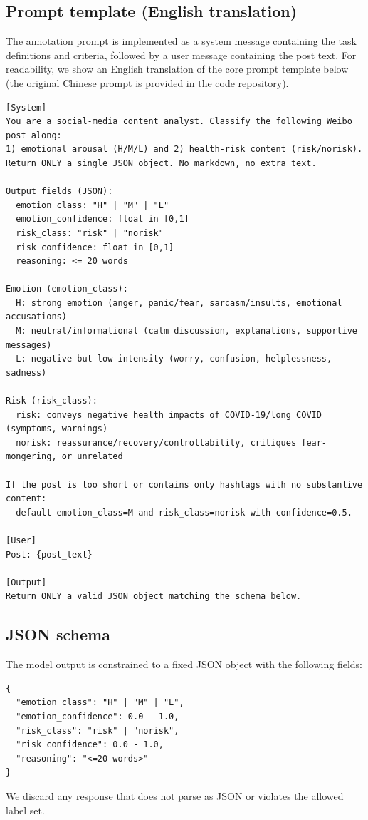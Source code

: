\documentclass[11pt]{article}
\begin{document}
\subsection{Prompt template (English translation)}
\label{supp:s1-prompt-template}
The annotation prompt is implemented as a system message containing the task definitions and criteria, followed by a user message containing the post text. For readability, we show an English translation of the core prompt template below (the original Chinese prompt is provided in the code repository).
\begin{verbatim}
[System]
You are a social-media content analyst. Classify the following Weibo post along:
1) emotional arousal (H/M/L) and 2) health-risk content (risk/norisk).
Return ONLY a single JSON object. No markdown, no extra text.

Output fields (JSON):
  emotion_class: "H" | "M" | "L"
  emotion_confidence: float in [0,1]
  risk_class: "risk" | "norisk"
  risk_confidence: float in [0,1]
  reasoning: <= 20 words

Emotion (emotion_class):
  H: strong emotion (anger, panic/fear, sarcasm/insults, emotional accusations)
  M: neutral/informational (calm discussion, explanations, supportive messages)
  L: negative but low-intensity (worry, confusion, helplessness, sadness)

Risk (risk_class):
  risk: conveys negative health impacts of COVID-19/long COVID (symptoms, warnings)
  norisk: reassurance/recovery/controllability, critiques fear-mongering, or unrelated

If the post is too short or contains only hashtags with no substantive content:
  default emotion_class=M and risk_class=norisk with confidence=0.5.

[User]
Post: {post_text}

[Output]
Return ONLY a valid JSON object matching the schema below.
\end{verbatim}

\subsection{JSON schema}
\label{supp:s1-json-schema}
The model output is constrained to a fixed JSON object with the following fields:
\begin{verbatim}
{
  "emotion_class": "H" | "M" | "L",
  "emotion_confidence": 0.0 - 1.0,
  "risk_class": "risk" | "norisk",
  "risk_confidence": 0.0 - 1.0,
  "reasoning": "<=20 words>"
}
\end{verbatim}
We discard any response that does not parse as JSON or violates the allowed label set.
\end{document}
